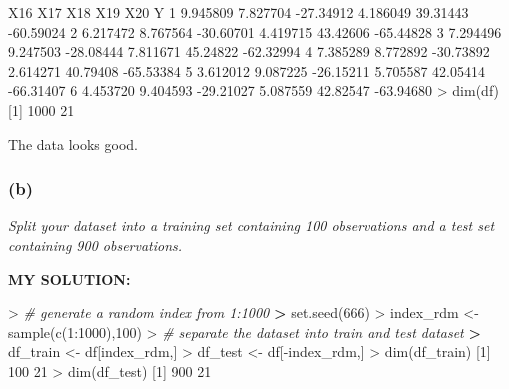 \documentclass[
]{article}
\newenvironment{Shaded}{\begin{snugshade}}{\end{snugshade}}
\newcommand{\CommentTok}[1]{\textcolor[rgb]{0.56,0.35,0.01}{\textit{#1}}}
\newcommand{\DecValTok}[1]{\textcolor[rgb]{0.00,0.00,0.81}{#1}}
\newcommand{\ErrorTok}[1]{\textcolor[rgb]{0.64,0.00,0.00}{\textbf{#1}}}
\newcommand{\FloatTok}[1]{\textcolor[rgb]{0.00,0.00,0.81}{#1}}
\newcommand{\FunctionTok}[1]{\textcolor[rgb]{0.00,0.00,0.00}{#1}}
\newcommand{\NormalTok}[1]{#1}
\newcommand{\OtherTok}[1]{\textcolor[rgb]{0.56,0.35,0.01}{#1}}
\newcommand{\SpecialCharTok}[1]{\textcolor[rgb]{0.00,0.00,0.00}{#1}}
\begin{document}
\begin{Shaded}
\begin{Highlighting}[]
\NormalTok{       X16      X17       X18      X19      X20         Y}
\DecValTok{1} \FloatTok{9.945809} \FloatTok{7.827704} \SpecialCharTok{{-}}\FloatTok{27.34912} \FloatTok{4.186049} \FloatTok{39.31443} \SpecialCharTok{{-}}\FloatTok{60.59024}
\DecValTok{2} \FloatTok{6.217472} \FloatTok{8.767564} \SpecialCharTok{{-}}\FloatTok{30.60701} \FloatTok{4.419715} \FloatTok{43.42606} \SpecialCharTok{{-}}\FloatTok{65.44828}
\DecValTok{3} \FloatTok{7.294496} \FloatTok{9.247503} \SpecialCharTok{{-}}\FloatTok{28.08444} \FloatTok{7.811671} \FloatTok{45.24822} \SpecialCharTok{{-}}\FloatTok{62.32994}
\DecValTok{4} \FloatTok{7.385289} \FloatTok{8.772892} \SpecialCharTok{{-}}\FloatTok{30.73892} \FloatTok{2.614271} \FloatTok{40.79408} \SpecialCharTok{{-}}\FloatTok{65.53384}
\DecValTok{5} \FloatTok{3.612012} \FloatTok{9.087225} \SpecialCharTok{{-}}\FloatTok{26.15211} \FloatTok{5.705587} \FloatTok{42.05414} \SpecialCharTok{{-}}\FloatTok{66.31407}
\DecValTok{6} \FloatTok{4.453720} \FloatTok{9.404593} \SpecialCharTok{{-}}\FloatTok{29.21027} \FloatTok{5.087559} \FloatTok{42.82547} \SpecialCharTok{{-}}\FloatTok{63.94680}
\SpecialCharTok{\textgreater{}} \FunctionTok{dim}\NormalTok{(df)}
\NormalTok{[}\DecValTok{1}\NormalTok{] }\DecValTok{1000}   \DecValTok{21}
\end{Highlighting}
\end{Shaded}

The data looks good.

\hypertarget{b}{%
\subsubsection{(b)}\label{b}}

\emph{Split your dataset into a training set containing 100 observations
and a test set containing 900 observations.}

\textbf{MY SOLUTION:}

\begin{Shaded}
\begin{Highlighting}[]
\SpecialCharTok{\textgreater{}} \CommentTok{\# generate a random index from 1:1000 }
\ErrorTok{\textgreater{}} \FunctionTok{set.seed}\NormalTok{(}\DecValTok{666}\NormalTok{)}
\SpecialCharTok{\textgreater{}}\NormalTok{ index\_rdm }\OtherTok{\textless{}{-}} \FunctionTok{sample}\NormalTok{(}\FunctionTok{c}\NormalTok{(}\DecValTok{1}\SpecialCharTok{:}\DecValTok{1000}\NormalTok{),}\DecValTok{100}\NormalTok{)}
\SpecialCharTok{\textgreater{}} \CommentTok{\# separate the dataset into train and test dataset}
\ErrorTok{\textgreater{}}\NormalTok{ df\_train }\OtherTok{\textless{}{-}}\NormalTok{ df[index\_rdm,]}
\SpecialCharTok{\textgreater{}}\NormalTok{ df\_test }\OtherTok{\textless{}{-}}\NormalTok{ df[}\SpecialCharTok{{-}}\NormalTok{index\_rdm,]}
\SpecialCharTok{\textgreater{}} \FunctionTok{dim}\NormalTok{(df\_train)}
\NormalTok{[}\DecValTok{1}\NormalTok{] }\DecValTok{100}  \DecValTok{21}
\SpecialCharTok{\textgreater{}} \FunctionTok{dim}\NormalTok{(df\_test)}
\NormalTok{[}\DecValTok{1}\NormalTok{] }\DecValTok{900}  \DecValTok{21}
\end{Highlighting}
\end{Shaded}
\end{document}
